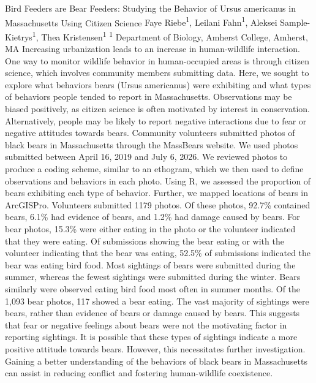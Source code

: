 \makeabstract
    {
    Bird Feeders are Bear Feeders: Studying the Behavior of Ursus americanus in Massachusetts Using Citizen Science
    }
    {
    Faye Riebe\textsuperscript{1}, Leilani Fahn\textsuperscript{1}, Aleksei Sample-Kietrys\textsuperscript{1}, Thea Kristensen\textsuperscript{1}
    }
    {
    \textsuperscript{1} Department of Biology, Amherst College, Amherst, MA
    }
    {
    Increasing urbanization leads to an increase in human-wildlife interaction. One way to monitor wildlife behavior in human-occupied areas is through citizen science, which involves community members submitting data. Here, we sought to explore what behaviors bears (Ursus americanus) were exhibiting and what types of behaviors people tended to report in Massachusetts. Observations may be biased positively, as citizen science is often motivated by interest in conservation. Alternatively, people may be likely to report negative interactions due to fear or negative attitudes towards bears.
    }
    {
    Community volunteers submitted photos of black bears in Massachusetts through the MassBears website. We used photos submitted between April 16, 2019 and July 6, 2026. We reviewed photos to produce a coding scheme, similar to an ethogram, which we then used to define observations and behaviors in each photo. Using R, we assessed the proportion of bears exhibiting each type of behavior. Further, we mapped locations of bears in ArcGISPro. 
    }
    {
    Volunteers submitted 1179 photos. Of these photos, 92.7\% contained bears, 6.1\% had evidence of bears, and 1.2\% had damage caused by bears. For bear photos, 15.3\% were either eating in the photo or the volunteer indicated that they were eating. Of submissions showing the bear eating or with the volunteer indicating that the bear was eating, 52.5\% of submissions indicated the bear was eating bird food. Most sightings of bears were submitted during the summer, whereas the fewest sightings were submitted during the winter. Bears similarly were observed eating bird food most often in summer months. Of the 1,093 bear photos, 117 showed a bear eating.
    }
    {
    The vast majority of sightings were bears, rather than evidence of bears or damage caused by bears. This suggests that fear or negative feelings about bears were not the motivating factor in reporting sightings. It is possible that these types of sightings indicate a more positive attitude towards bears. However, this necessitates further investigation. Gaining a better understanding of the behaviors of black bears in Massachusetts can assist in reducing conflict and fostering human-wildlife coexistence.
    }

    \newpage
    